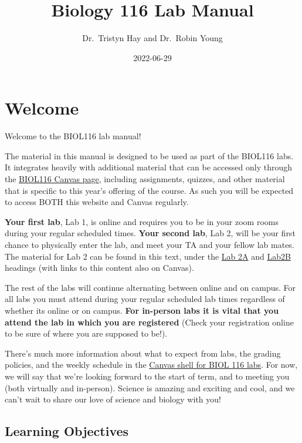 \documentclass[
]{book}
\title{Biology 116 Lab Manual}
\author{Dr.~Tristyn Hay and Dr.~Robin Young}
\date{2022-06-29}
\begin{document}
\maketitle

{
\setcounter{tocdepth}{1}
\tableofcontents
}
\hypertarget{welcome}{%
\chapter*{Welcome}\label{welcome}}

Welcome to the BIOL116 lab manual!

The material in this manual is designed to be used as part of the BIOL116 labs. It integrates heavily with additional material that can be accessed only through the \href{https://canvas.ubc.ca/courses/94572}{BIOL116 Canvas page}, including assignments, quizzes, and other material that is specific to this year's offering of the course. As such you will be expected to access BOTH this website and Canvas regularly.

\textbf{Your first lab}, Lab 1, is online and requires you to be in your zoom rooms during your regular scheduled times. \textbf{Your second lab}, Lab 2, will be your first chance to physically enter the lab, and meet your TA and your fellow lab mates. The material for Lab 2 can be found in this text, under the \href{https://ubco-biology.github.io/BIOL-116-Lab-Manual/the-process-of-science.html}{Lab 2A} and \href{https://ubco-biology.github.io/BIOL-116-Lab-Manual/research-project.html}{Lab2B} headings (with links to this content also on Canvas).

The rest of the labs will continue alternating between online and on campus. For all labs you must attend during your regular scheduled lab times regardless of whether its online or on campus. \textbf{For in-person labs it is vital that you attend the lab in which you are registered} (Check your registration online to be sure of where you are supposed to be!).

There's much more information about what to expect from labs, the grading policies, and the weekly schedule in the \href{https://canvas.ubc.ca}{Canvas shell for BIOL 116 labs}. For now, we will say that we're looking forward to the start of term, and to meeting you (both virtually and in-person). Science is amazing and exciting and cool, and we can't wait to share our love of science and biology with you!

\hypertarget{learning-objectives}{%
\section*{Learning Objectives}\label{learning-objectives}}
\end{document}
